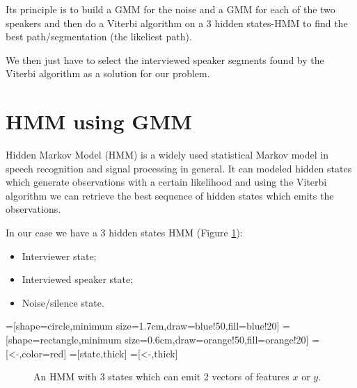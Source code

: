 \documentclass{techrep} %
\begin{document}
Its principle is to build a GMM for the noise and a GMM for each of
the two speakers and then do a Viterbi algorithm on a 3 hidden
states-HMM to find the best path/segmentation (the likeliest path).


We then just have to select the interviewed speaker segments found by
the Viterbi algorithm as a solution for our problem.


\section{HMM using GMM}

Hidden Markov Model (HMM) is a widely used statistical Markov model in
speech recognition and signal processing in general. It can modeled
hidden states which generate observations with a certain likelihood
and using the Viterbi algorithm we can retrieve the best sequence of
hidden states which emits the observations.


In our case we have a 3 hidden states HMM (Figure \ref{hmm}):
\begin{itemize}
\item Interviewer state;
\item Interviewed speaker state;
\item Noise/silence state.
\end{itemize}

=[shape=circle,minimum size=1.7cm,draw=blue!50,fill=blue!20]
=[shape=rectangle,minimum size=0.6cm,draw=orange!50,fill=orange!20]
=[<-,color=red] =[state,thick]
=[<-,thick]
\begin{figure}[H]
  \begin{center}
  \end{center}
  \label{hmm}
  \caption{An HMM with 3 states which can emit 2 vectors of features $x$ or $y$.}
\end{figure}
\end{document}
